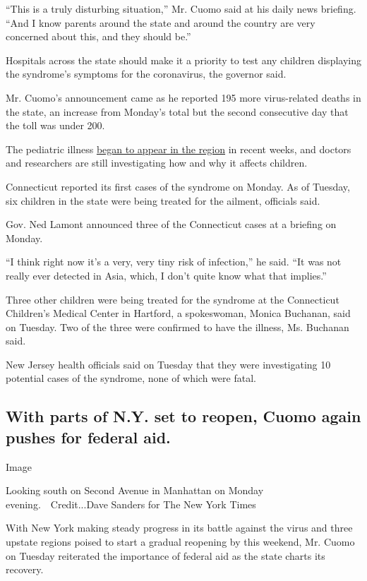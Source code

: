 ``This is a truly disturbing situation,'' Mr. Cuomo said at his daily
news briefing. ``And I know parents around the state and around the
country are very concerned about this, and they should be.''

Hospitals across the state should make it a priority to test any
children displaying the syndrome's symptoms for the coronavirus, the
governor said.

Mr. Cuomo's announcement came as he reported 195 more virus-related
deaths in the state, an increase from Monday's total but the second
consecutive day that the toll was under 200.

The pediatric illness
\href{https://www.nytimes3xbfgragh.onion/2020/05/05/nyregion/kawasaki-disease-coronavirus.html?module=inline}{began
to appear in the region} in recent weeks, and doctors and researchers
are still investigating how and why it affects children.

Connecticut reported its first cases of the syndrome on Monday. As of
Tuesday, six children in the state were being treated for the ailment,
officials said.

Gov. Ned Lamont announced three of the Connecticut cases at a briefing
on Monday.

``I think right now it's a very, very tiny risk of infection,'' he said.
``It was not really ever detected in Asia, which, I don't quite know
what that implies.''

Three other children were being treated for the syndrome at the
Connecticut Children's Medical Center in Hartford, a spokeswoman, Monica
Buchanan, said on Tuesday. Two of the three were confirmed to have the
illness, Ms. Buchanan said.

New Jersey health officials said on Tuesday that they were investigating
10 potential cases of the syndrome, none of which were fatal.

\hypertarget{with-parts-of-ny-set-to-reopen-cuomo-again-pushes-for-federal-aid}{%
\subsection{With parts of N.Y. set to reopen, Cuomo again pushes for
federal
aid.}\label{with-parts-of-ny-set-to-reopen-cuomo-again-pushes-for-federal-aid}}

Image

Looking south on Second Avenue in Manhattan on Monday
evening.~~Credit...Dave Sanders for The New York Times

With New York making steady progress in its battle against the virus and
three upstate regions poised to start a gradual reopening by this
weekend, Mr. Cuomo on Tuesday reiterated the importance of federal aid
as the state charts its recovery.

